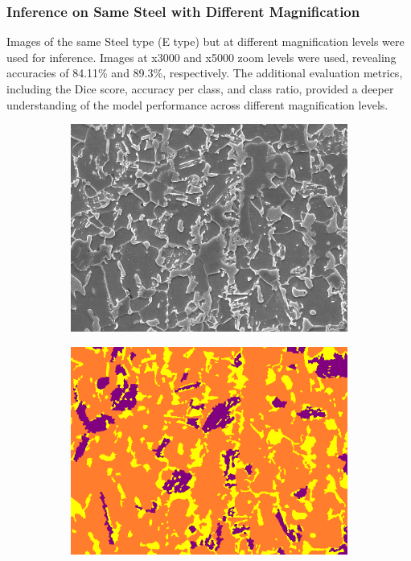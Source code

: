 \documentclass[]{article}
\begin{document}
\subsubsection{Inference on Same Steel with Different Magnification}

Images of the same Steel type (E type) but at different magnification levels were used for inference. Images at x3000 and x5000 zoom levels were used, revealing accuracies of 84.11\% and 89.3\%, respectively. The additional evaluation metrics, including the Dice score, accuracy per class, and class ratio, provided a deeper understanding of the model performance across different magnification levels. 
\begin{figure}[ht]
	\centering
	
	\begin{subfigure}[b]{0.3\textwidth}
		\centering
		\includegraphics[width=\textwidth]{images/inference/SameSteelDiffMag-O.jpg}
		\caption{}
		\label{fig:samesteeldiffmag3K-orig}
	\end{subfigure}
	\hfill
	\begin{subfigure}[b]{0.3\textwidth}
		\centering
		\includegraphics[width=\textwidth]{images/inference/SameSteelDiffMag-L.png}

\end{subfigure}
\end{figure}
\end{document}
